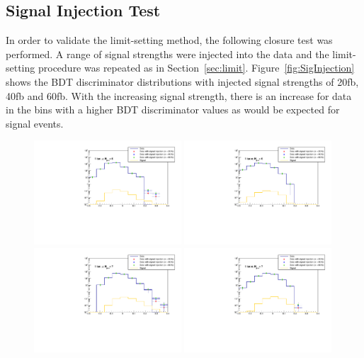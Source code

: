 \subsection{Signal Injection Test}
\label{sec:signalinjection}
In order to validate the limit-setting method, the following closure test was performed. A range of signal strengths were injected into the data and the limit-setting procedure was repeated as in Section~\ref{sec:limit}. Figure~\ref{fig:SigInjection} shows the BDT discriminator distributions with injected signal strengths of 20fb, 40fb and 60fb. With the increasing signal strength, there is an increase for data in the bins with a higher BDT discriminator values as would be expected for signal events.
\begin{figure}[ht!]
\centering
    \includegraphics[width=0.49\textwidth]{images/Run1/SignalInjection_Mu_6j.pdf}
     \includegraphics[width=0.49\textwidth]{images/Run1/SignalInjection_El_6j.pdf}
    \includegraphics[width=0.49\textwidth]{images/Run1/SignalInjection_Mu_7j.pdf}
     \includegraphics[width=0.49\textwidth]{images/Run1/SignalInjection_El_7j.pdf}

\end{figure}
